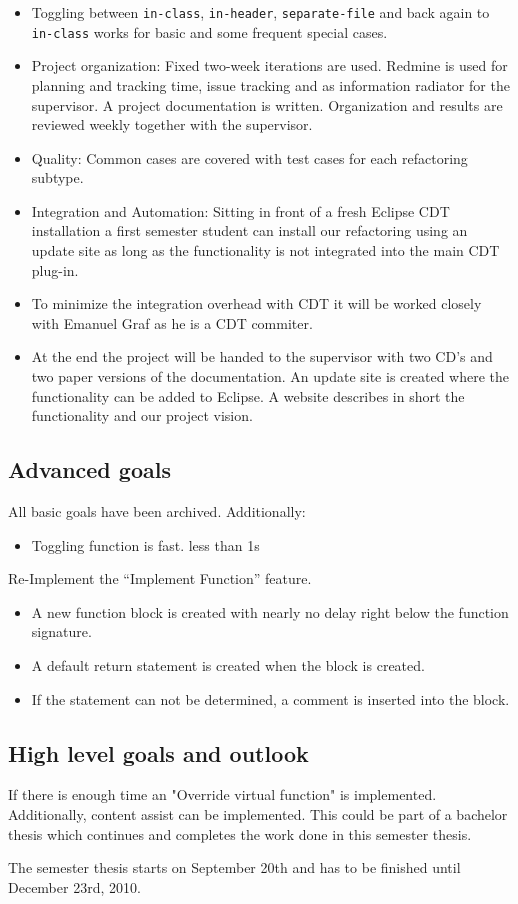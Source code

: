 \documentclass[a4paper,10pt]{scrreprt}
\begin{document}
\begin{itemize}
 \item Toggling between \texttt{in-class}, \texttt{in-header},
\texttt{separate-file} and back again to \texttt{in-class} works for basic and
some frequent special cases.
 \item Project organization: Fixed two-week iterations are used. Redmine is used
for planning and tracking time, issue tracking and as information radiator for
the supervisor. A project documentation is written. Organization and results are
reviewed weekly together with the supervisor.
 \item Quality: Common cases are covered with test cases for each
refactoring subtype.
 \item Integration and Automation: Sitting in front of a fresh Eclipse CDT
installation a first semester student can install our refactoring using an
update site as long as the functionality is not integrated into the main CDT
plug-in.
 \item To minimize the integration overhead with CDT it will be worked closely
with Emanuel Graf as he is a CDT commiter.
 \item At the end the project will be handed to the supervisor with two CD's and
two paper versions of the documentation. An update site is created where the
functionality can be added to Eclipse. A website describes in short the
functionality and our project vision.
\end{itemize}

\subsection*{Advanced goals}
All basic goals have been archived. Additionally:\newline
\begin{itemize}
 \item Toggling function is fast. less than 1s
\end{itemize}

Re-Implement the ``Implement Function'' feature.
\begin{itemize}
 \item A new function block is created with nearly no delay right below the
function signature.
 \item A default return statement is created when the block is created.
 \item If the statement can not be determined, a comment is inserted into the block.
\end{itemize}

\subsection*{High level goals and outlook}

If there is enough time an "Override virtual function" is implemented.
Additionally, content assist can be implemented. This could be part of a
bachelor thesis which continues and completes the work done in this semester
thesis.

The semester thesis starts on September 20th and has to be finished until
December 23rd, 2010.
\end{document}
